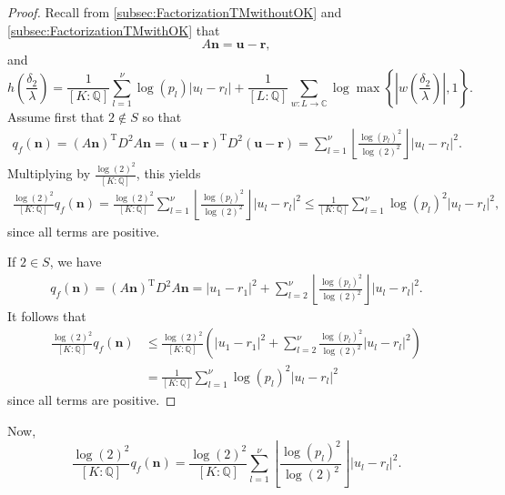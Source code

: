 \begin{proof}
Recall from \autoref{subsec:FactorizationTMwithoutOK} and \autoref{subsec:FactorizationTMwithOK} that
\[A\mathbf{n} = \mathbf{u} - \mathbf{r},\]
and
\[h\left(\frac{\delta_2}{\lambda}\right) = \frac{1}{[K:\mathbb{Q}]}\sum_{l = 1}^{\nu} \log(p_l)|u_l - r_l| + \frac{1}{[L:\mathbb{Q}]}\sum_{w :L \to \mathbb{C}} \log \max \left\{ \left|w\left(\frac{\delta_2}{\lambda}\right)\right|, 1\right\}.\]
Assume first that $2 \notin S$ so that
\begin{align*}
q_f(\mathbf{n})	
	 = (A\mathbf{n})^{\text{T}}D^2A\mathbf{n}
	 = (\mathbf{u} - \mathbf{r})^{\text{T}}D^2(\mathbf{u} - \mathbf{r})
	 = \sum_{l = 1}^{\nu}\left\lfloor\frac{\log(p_l)^2}{\log(2)^2}\right\rfloor|u_l-r_l|^2.
\end{align*}
Multiplying by $\frac{\log(2)^2}{[K:\mathbb{Q}]}$, this yields
\begin{align*}
\frac{\log(2)^2}{[K:\mathbb{Q}]}q_f(\mathbf{n})  
	= \frac{\log(2)^2}{[K:\mathbb{Q}]}\sum_{l = 1}^{\nu} \left\lfloor\frac{\log(p_l)^2}{\log(2)^2}\right\rfloor|u_l -r_l|^2 
 	\leq \frac{1}{[K:\mathbb{Q}]}\sum_{l = 1}^{\nu}\log(p_l)^2|u_l -r_l|^2,
\end{align*}
since all terms are positive. 

If $2 \in S$, we have
\begin{align*}
q_f(\mathbf{n})	
	 = (A\mathbf{n})^{\text{T}}D^2A\mathbf{n}
	 = |u_1 - r_1|^2 + \sum_{l = 2}^{\nu}\left\lfloor\frac{\log(p_l)^2}{\log(2)^2}\right\rfloor|u_l-r_l|^2.
\end{align*}
It follows that
\begin{align*}
\frac{\log(2)^2}{[K:\mathbb{Q}]}q_f(\mathbf{n}) 
	& \leq \frac{\log(2)^2}{[K:\mathbb{Q}]}\left( |u_1 - r_1|^2 + \sum_{l = 2}^{\nu} \frac{\log(p_l)^2}{\log(2)^2}|u_l -r_l|^2\right) \\
	& = \frac{1}{[K:\mathbb{Q}]}\sum_{l = 1}^{\nu}\log(p_l)^2|u_l -r_l|^2
\end{align*}
since all terms are positive. 
\end{proof}

Now, 
\[\frac{\log(2)^2}{[K:\mathbb{Q}]}q_f(\mathbf{n}) =  \frac{\log(2)^2}{[K:\mathbb{Q}]} \sum_{l = 1}^{\nu}\left\lfloor\frac{\log(p_l)^2}{\log(2)^2}\right\rfloor|u_l-r_l|^2.\]


